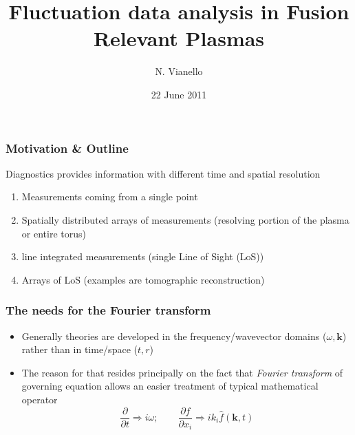 \documentclass[t,10pt]{beamer}
\title{Fluctuation data analysis in Fusion Relevant Plasmas}
\author{N. Vianello }
\date{22 June 2011}
\begin{document}
\begin{titleframe}
\end{titleframe}

\begin{frame}
\frametitle{Motivation \& Outline}
Diagnostics provides information with different time and spatial resolution
\begin{enumerate}
\item Measurements coming from a single point  
\item Spatially distributed arrays of measurements (resolving portion
  of the plasma or entire torus)
\item line integrated measurements (single Line of Sight (LoS)) 
\item Arrays of LoS (examples are tomographic reconstruction)
\end{enumerate}
\end{frame}

\begin{frame}
\frametitle{ The needs for the Fourier transform}
\begin{itemize}[<+-|alert@+>]
\item Generally theories are developed in the frequency/wavevector
  domains ($\omega,\mathbf{k}$) rather than in time/space ($t,r$)
\item The reason for that resides principally on the fact that
  \emph{Fourier transform} of governing equation allows an easier
  treatment of typical mathematical operator
\begin{equation*}
\frac{\partial}{\partial t} \Longrightarrow i\omega; \qquad
\frac{\partial f}{\partial x_i} \Longrightarrow i k_i \hat{f}(\mathbf{k},t)
\end{equation*}
\end{itemize}
\end{frame}
\end{document}
